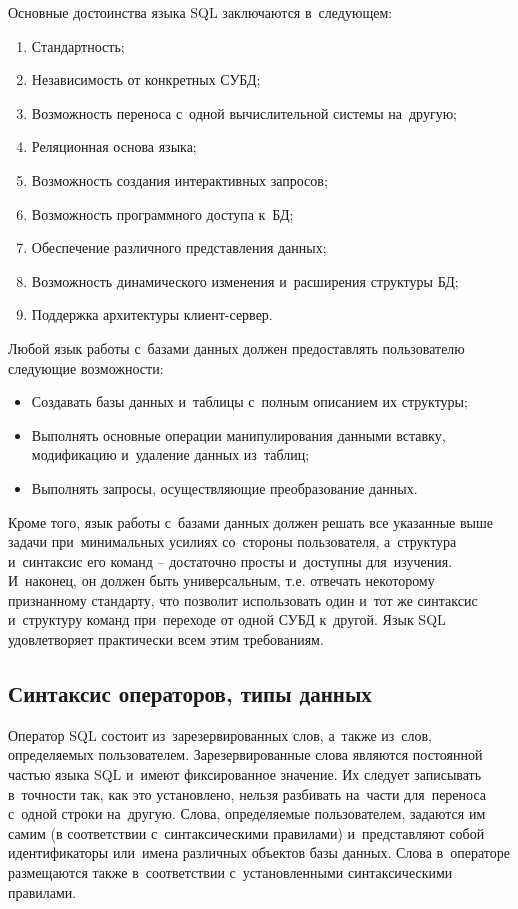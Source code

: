 \documentclass{ou}
\begin{document}
Основные достоинства языка SQL заключаются в~следующем:
\begin{enumerate}[leftmargin=0em, itemindent=3.75em, nosep, label=\arabic*)]
\item Стандартность;
\item Независимость от конкретных СУБД;
\item Возможность переноса с~одной вычислительной системы на~другую;
\item Реляционная основа языка;
\item Возможность создания интерактивных запросов;
\item Возможность программного доступа к~БД;
\item Обеспечение различного представления данных;
\item Возможность динамического изменения и~расширения структуры БД;
\item Поддержка архитектуры клиент-сервер.
\end{enumerate}

Любой язык работы с~базами данных должен предоставлять пользователю следующие возможности:

\begin{itemize}[label=-, leftmargin=0em, itemindent=3.35em, nosep]
\item Создавать базы данных и~таблицы с~полным описанием их структуры;
\item Выполнять основные операции манипулирования данными вставку, модификацию и~удаление данных из~таблиц;
\item Выполнять запросы, осуществляющие преобразование данных.
\end{itemize}

Кроме того, язык работы с~базами данных должен решать все указанные выше задачи при~минимальных усилиях со~стороны пользователя, а~структура и~синтаксис его команд -- достаточно просты и~доступны для~изучения. И~наконец, он должен быть универсальным, т.е. отвечать некоторому признанному стандарту, что позволит использовать один и~тот же синтаксис и~структуру команд при~переходе от одной СУБД к~другой. Язык SQL удовлетворяет практически всем этим требованиям. 

\subsection{Синтаксис операторов, типы данных} 
Оператор SQL состоит из~зарезервированных слов, а~также из~слов, определяемых пользователем. Зарезервированные слова являются постоянной частью языка SQL и~имеют фиксированное значение. Их следует записывать в~точности так, как это установлено, нельзя разбивать на~части для~переноса с~одной строки на~другую. Слова, определяемые пользователем, задаются им самим (в соответствии с~синтаксическими правилами) и~представляют собой идентификаторы или~имена различных объектов базы данных. Слова в~операторе размещаются также в~соответствии с~установленными синтаксическими правилами. 
\end{document}
